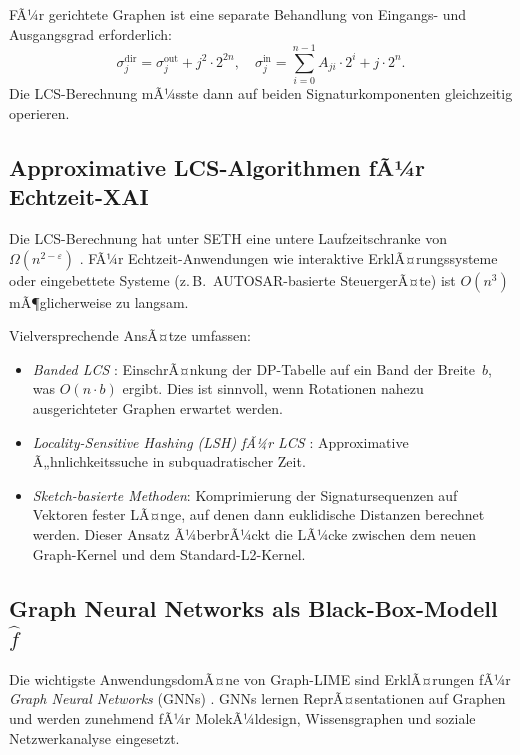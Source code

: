 ﻿\documentclass[a4paper,12pt]{article}
\theoremstyle{definition}
\begin{document}
FÃ¼r gerichtete Graphen ist eine separate Behandlung von Eingangs- und Ausgangsgrad
erforderlich:
\[
  \sigma_j^{\mathrm{dir}} = \sigma_j^{\mathrm{out}} + j^2 \cdot 2^{2n},
  \quad \sigma_j^{\mathrm{in}} = \sum_{i=0}^{n-1} A_{ji} \cdot 2^i + j \cdot 2^n.
\]
Die LCS-Berechnung mÃ¼sste dann auf beiden Signaturkomponenten gleichzeitig operieren.

\subsection{Approximative LCS-Algorithmen fÃ¼r Echtzeit-XAI}

Die LCS-Berechnung hat unter SETH eine untere Laufzeitschranke von
$\Omega(n^{2-\varepsilon})$ \citep{Abboud2015}.
FÃ¼r Echtzeit-Anwendungen wie interaktive ErklÃ¤rungssysteme oder eingebettete
Systeme (z.\,B.\ AUTOSAR-basierte SteuergerÃ¤te) ist $O(n^3)$ mÃ¶glicherweise
zu langsam.

Vielversprechende AnsÃ¤tze umfassen:
\begin{itemize}
  \item \emph{Banded LCS} \citep{Allison1986}: EinschrÃ¤nkung der DP-Tabelle auf
        ein Band der Breite~$b$, was $O(n \cdot b)$ ergibt.
        Dies ist sinnvoll, wenn Rotationen nahezu ausgerichteter Graphen erwartet werden.
  \item \emph{Locality-Sensitive Hashing (LSH) fÃ¼r LCS} \citep{Indyk1998}:
        Approximative Ã„hnlichkeitssuche in subquadratischer Zeit.
  \item \emph{Sketch-basierte Methoden}: Komprimierung der Signatursequenzen
        auf Vektoren fester LÃ¤nge, auf denen dann euklidische Distanzen berechnet
        werden.
        Dieser Ansatz Ã¼berbrÃ¼ckt die LÃ¼cke zwischen dem neuen Graph-Kernel und
        dem Standard-L2-Kernel.
\end{itemize}

\subsection{Graph Neural Networks als Black-Box-Modell $\hat{f}$}

Die wichtigste AnwendungsdomÃ¤ne von Graph-LIME sind ErklÃ¤rungen fÃ¼r
\emph{Graph Neural Networks} (GNNs) \citep{Scarselli2009, Kipf2017}.
GNNs lernen ReprÃ¤sentationen auf Graphen und werden zunehmend fÃ¼r
MolekÃ¼ldesign, Wissensgraphen und soziale Netzwerkanalyse eingesetzt.
\end{document}
